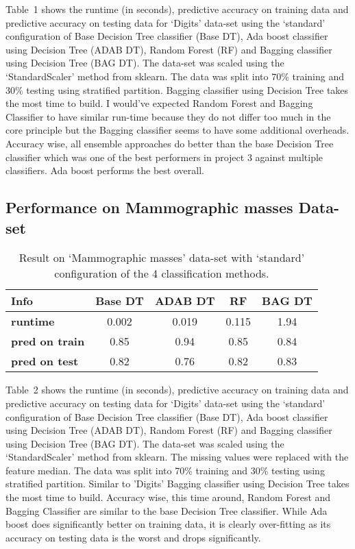 \documentclass[12pt]{article}
\begin{document}
Table~1 shows the runtime (in seconds), predictive accuracy on training data and predictive accuracy on testing data for `Digits' data-set using the `standard' configuration of Base Decision Tree classifier (Base DT), Ada boost classifier using Decision Tree (ADAB DT), Random Forest (RF) and Bagging classifier using Decision Tree (BAG DT). The data-set was scaled using the `StandardScaler' method from sklearn. The data was split into 70\% training and 30\% testing using stratified partition.  Bagging classifier using Decision Tree takes the most time to build. I would've expected Random Forest and Bagging Classifier to have similar run-time because they do not differ too much in the core principle but the Bagging classifier seems to have some additional overheads. Accuracy wise, all ensemble approaches do better than the base Decision Tree classifier which was one of the best performers in project 3 against multiple classifiers. Ada boost performs the best overall.

\subsection*{Performance on Mammographic masses Data-set}

\begin{table}[!hptb]
\centering
\begin{tabular}{|l|c|c|c|c|}
\hline
\textbf{Info} & \textbf{Base DT} & \textbf{ADAB DT} & \textbf{RF} & \textbf{BAG DT} \\\hline
\textbf{runtime} & 0.002& 0.019 & 0.115 & 1.94 \\
\textbf{pred on train} & 0.85 & 0.94 & 0.85 & 0.84 \\
\textbf{pred on test} & 0.82 & 0.76 & 0.82 & 0.83 \\\hline
\end{tabular}
\caption{Result on `Mammographic masses' data-set with `standard' configuration of the 4 classification methods.}
\end{table}

Table~2 shows the runtime (in seconds), predictive accuracy on training data and predictive accuracy on testing data for `Digits' data-set using the `standard' configuration of Base Decision Tree classifier (Base DT), Ada boost classifier using Decision Tree (ADAB DT), Random Forest (RF) and Bagging classifier using Decision Tree (BAG DT). The data-set was scaled using the `StandardScaler' method from sklearn. The missing values were replaced with the feature median. The data was split into 70\% training and 30\% testing using stratified partition.  Similar to 'Digits' Bagging classifier using Decision Tree takes the most time to build. Accuracy wise, this time around, Random Forest and Bagging Classifier are similar to the base Decision Tree classifier. While Ada boost does significantly better on training data, it is clearly over-fitting as its accuracy on testing data is the worst and drops significantly.
\end{document}
